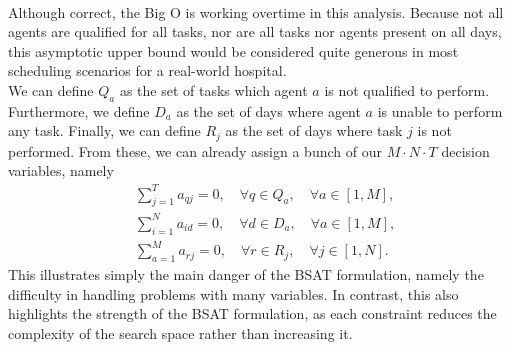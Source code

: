 \\
Although correct, the Big O is working overtime in this analysis. Because not all agents are qualified for all tasks, nor are all tasks nor agents present on all days, this asymptotic upper bound would be considered quite generous in most scheduling scenarios for a real-world hospital. 
\\
We can define \(Q_a\) as the set of tasks which agent \(a\) is not qualified to perform. Furthermore, we define \(D_a\) as the set of days where agent \(a\) is unable to perform any task. Finally, we can define \(R_j\) as the set of days where task \(j\) is not performed. From these, we can already assign a bunch of our \(M \cdot N \cdot T\) decision variables, namely
\begin{align*}
    &\sum_{j = 1}^T a_{qj} = 0, \quad \forall q \in Q_a, \quad \forall a \in [1, M],
    \\
    &\sum_{i = 1}^N a_{id} = 0, \quad \forall d \in D_a, \quad \forall a \in [1, M],
    \\
    &\sum_{a = 1}^M a_{rj} = 0, \quad \forall r \in R_j, \quad \forall j \in [1, N].
\end{align*}
This illustrates simply the main danger of the BSAT formulation, namely the difficulty in handling problems with many variables. In contrast, this also highlights the strength of the BSAT formulation, as each constraint reduces the complexity of the search space rather than increasing it.